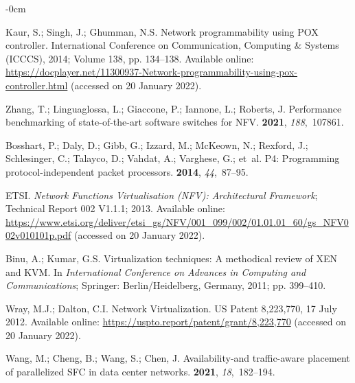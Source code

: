 \documentclass[futureinternet,review,accept,pdftex,moreauthors]{Definitions/mdpi}
\begin{document}
\begin{adjustwidth}{-\extralength}{0cm}
\begin{thebibliography}{999}
Kaur, S.; Singh, J.; Ghumman, N.S.
\newblock Network programmability using POX controller.
  International Conference on Communication, Computing \& Systems (ICCCS),  2014; Volume 138, pp.
  134--138. \newblock  Available online: \url{https://docplayer.net/11300937-Network-programmability-using-pox-controller.html}{ (accessed on 20 January 2022).}

Zhang, T.; Linguaglossa, L.; Giaccone, P.; Iannone, L.; Roberts, J.
\newblock Performance benchmarking of state-of-the-art software switches for
  NFV.
 {\bf 2021}, {\em 188},~107861.

Bosshart, P.; Daly, D.; Gibb, G.; Izzard, M.; McKeown, N.; Rexford, J.;
  Schlesinger, C.; Talayco, D.; Vahdat, A.; Varghese, G.;  et~al.
\newblock P4: Programming protocol-independent packet processors.
 {\bf 2014}, {\em
  44},~87--95.

ETSI.
\newblock \emph{Network Functions Virtualisation ({NFV}): Architectural Framework};
\newblock Technical Report 002 V1.1.1;  {2013.} \newblock  Available online: \url{https://www.etsi.org/deliver/etsi_gs/NFV/001_099/002/01.01.01_60/gs_NFV002v010101p.pdf}{ (accessed on 20 January 2022).}%


Binu, A.; Kumar, G.S.
\newblock Virtualization techniques: A methodical review of XEN and KVM.
\newblock  In \emph{International Conference on Advances in Computing and
  Communications}; Springer:  {Berlin/Heidelberg, Germany,} %
 2011; pp. 399--410.

Wray, M.J.; Dalton, C.I.
\newblock Network Virtualization.
\newblock US Patent 8,223,770,  17 July {2012}. \newblock  Available online: \url{https://uspto.report/patent/grant/8,223,770}{ (accessed on 20 January 2022).}

Wang, M.; Cheng, B.; Wang, S.; Chen, J.
\newblock Availability-and traffic-aware placement of parallelized SFC in data
  center networks.
 {\bf 2021},
  {\em 18},~182--194.


\end{thebibliography}
\end{adjustwidth}
\end{document}
